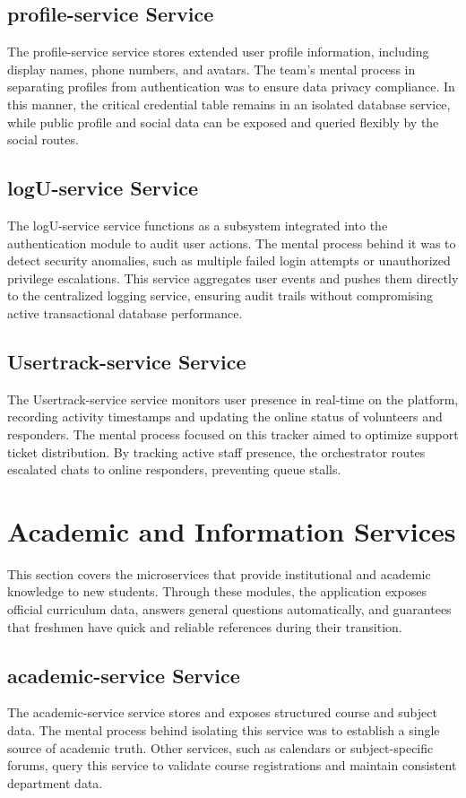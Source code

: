 \documentclass[12pt]{article}
\begin{document}
\subsection{profile-service Service}
The profile-service service stores extended user profile information, including display names, phone numbers, and avatars. The team's mental process in separating profiles from authentication was to ensure data privacy compliance. In this manner, the critical credential table remains in an isolated database service, while public profile and social data can be exposed and queried flexibly by the social routes.

\subsection{logU-service Service}
The logU-service service functions as a subsystem integrated into the authentication module to audit user actions. The mental process behind it was to detect security anomalies, such as multiple failed login attempts or unauthorized privilege escalations. This service aggregates user events and pushes them directly to the centralized logging service, ensuring audit trails without compromising active transactional database performance.

\subsection{Usertrack-service Service}
The Usertrack-service service monitors user presence in real-time on the platform, recording activity timestamps and updating the online status of volunteers and responders. The mental process focused on this tracker aimed to optimize support ticket distribution. By tracking active staff presence, the orchestrator routes escalated chats to online responders, preventing queue stalls.

\section{Academic and Information Services}
This section covers the microservices that provide institutional and academic knowledge to new students. Through these modules, the application exposes official curriculum data, answers general questions automatically, and guarantees that freshmen have quick and reliable references during their transition.

\subsection{academic-service Service}
The academic-service service stores and exposes structured course and subject data. The mental process behind isolating this service was to establish a single source of academic truth. Other services, such as calendars or subject-specific forums, query this service to validate course registrations and maintain consistent department data.
\end{document}
